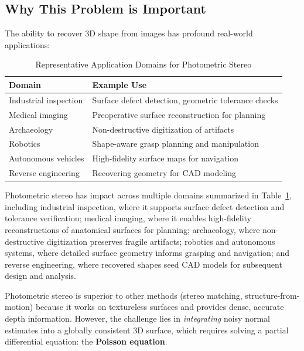 \documentclass[11pt]{article}
\begin{document}

\subsection{Why This Problem is Important}

The ability to recover 3D shape from images has profound real-world applications:

\begin{table}[H]
\centering
\caption{Representative Application Domains for Photometric Stereo}
\label{tab:ps_applications}
\begin{tabular}{ll}
\hline\hline
\textbf{Domain} & \textbf{Example Use} \\
\hline
Industrial inspection & Surface defect detection, geometric tolerance checks \\
Medical imaging & Preoperative surface reconstruction for planning \\
Archaeology & Non-destructive digitization of artifacts \\
Robotics & Shape-aware grasp planning and manipulation \\
Autonomous vehicles & High-fidelity surface maps for navigation \\
Reverse engineering & Recovering geometry for CAD modeling \\
\hline\hline
\end{tabular}
\end{table}


Photometric stereo has impact across multiple domains summarized in Table~\ref{tab:ps_applications}, including
industrial inspection, where it supports surface defect detection and
tolerance verification; medical imaging, where it enables high-fidelity
reconstructions of anatomical surfaces for planning; archaeology, where
non-destructive digitization preserves fragile artifacts; robotics and
autonomous systems, where detailed surface geometry informs grasping and
navigation; and reverse engineering, where recovered shapes seed CAD
models for subsequent design and analysis.

Photometric stereo is superior to other methods (stereo matching, structure-from-motion) because it works on textureless surfaces and provides dense, accurate depth information. 
However, the challenge lies in \textit{integrating} noisy normal estimates into a globally consistent 3D surface, which requires solving a partial differential equation: the \textbf{Poisson equation}.
\end{document}
